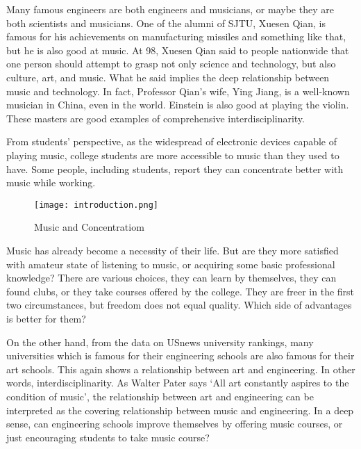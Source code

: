 Many famous engineers are both engineers and musicians, or maybe they are both scientists and musicians. One of the alumni of SJTU, Xuesen Qian, is famous for his achievements on manufacturing missiles and something like that, but he is also good at music. At 98, Xuesen Qian said to people nationwide that one person should attempt to grasp not only science and technology, but also culture, art, and music. What he said implies the deep relationship between music and technology. In fact, Professor Qian’s wife, Ying Jiang, is a well-known musician in China, even in the world. Einstein is also good at playing the violin. These masters are good examples of comprehensive interdisciplinarity.\par
From students’ perspective, as the widespread of electronic devices capable of playing music, college students are more accessible to music than they used to have. Some people, including students, report they can concentrate better with music while working. 

\begin{figure}
\centering
\texttt{[image: introduction.png]}
\label{Music and Concentration}
\caption{Music and Concentratiom}
\end{figure}

Music has already become a necessity of their life. But are they more satisfied with amateur state of listening to music, or acquiring some basic professional knowledge? There are various choices, they can learn by themselves, they can found clubs, or they take courses offered by the college. They are freer in the first two circumstances, but freedom does not equal quality. Which side of advantages is better for them?\par
On the other hand, from the data on USnews university rankings, many universities which is famous for their engineering schools are also famous for their art schools. This again shows a relationship between art and engineering. In other words, interdisciplinarity. As Walter Pater says ‘All art constantly aspires to the condition of music’, the relationship between art and engineering can be interpreted as the covering relationship between music and engineering. In a deep sense, can engineering schools improve themselves by offering music courses, or just encouraging students to take music course?\par
